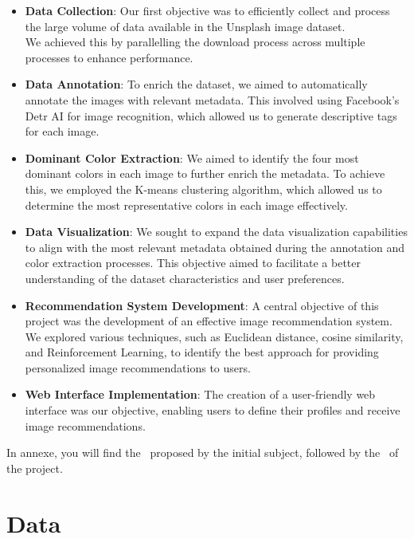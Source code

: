 \documentclass{article}
\begin{document}
    \begin{itemize}
        \item \textbf{Data Collection}: Our first objective was to efficiently collect and process the large volume of data available in the Unsplash image dataset.\\We achieved this by parallelling the download process across multiple processes to enhance performance.
        \item \textbf{Data Annotation}: To enrich the dataset, we aimed to automatically annotate the images with relevant metadata. This involved using Facebook's Detr AI for image recognition, which allowed us to generate descriptive tags for each image.
        \item \textbf{Dominant Color Extraction}: We aimed to identify the four most dominant colors in each image to further enrich the metadata. To achieve this, we employed the K-means clustering algorithm, which allowed us to determine the most representative colors in each image effectively.
        \item \textbf{Data Visualization}: We sought to expand the data visualization capabilities to align with the most relevant metadata obtained during the annotation and color extraction processes. This objective aimed to facilitate a better understanding of the dataset characteristics and user preferences.
        \item \textbf{Recommendation System Development}: A central objective of this project was the development of an effective image recommendation system. We explored various techniques, such as Euclidean distance, cosine similarity, and Reinforcement Learning, to identify the best approach for providing personalized image recommendations to users.
        \item \textbf{Web Interface Implementation}: The creation of a user-friendly web interface was our objective, enabling users to define their profiles and receive image recommendations.
    \end{itemize}

    In annexe, you will find the~\hyperref[subsec:target_architecture]{} proposed by the initial subject, followed by the~\hyperref[subsec:actual_architecture]{} of the project.


    \section{Data}\label{sec:data}
\end{document}

